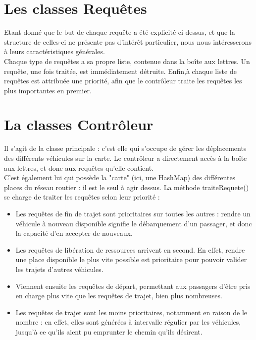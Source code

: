 \documentclass[a4paper, titlepage]{report}
\begin{document}
\section{Les classes Requêtes}

Etant donné que le but de chaque requête a été explicité ci-dessus, et que la structure de celles-ci ne présente pas d'intérêt particulier, nous nous intéresserons à leurs caractéristiques générales. \\
Chaque type de requêtes a sa propre liste, contenue dans la boîte aux lettres. Un requête, une fois traitée, est immédiatement détruite. Enfin,à chaque liste de requêtes est attribuée une priorité, afin que le contrôleur traite les requêtes les plus importantes en premier.
\section{La classes Contrôleur}

Il s'agit de la classe principale : c'est elle qui s'occupe de gérer les déplacements des différents véhicules sur la carte. Le contrôleur a directement accès à la boîte aux lettres, et donc aux requêtes qu'elle contient.\\
C'est également lui qui possède la "carte" (ici, une HashMap) des différentes places du réseau routier : il est le seul à agir dessus.
La méthode traiteRequete() se charge de traiter les requêtes selon leur priorité :\\
 \begin{itemize}
      \item Les requêtes de fin de trajet sont prioritaires sur toutes les autres : rendre un véhicule à nouveau disponible signifie le débarquement d'un passager, et donc la capacité d'en accepter de nouveaux.
      \item Les requêtes de libération de ressources arrivent en second. En effet, rendre une place disponible le plus vite possible est prioritaire pour pouvoir valider les trajets d'autres véhicules.
      \item Viennent ensuite les requêtes de départ, permettant aux passagers d'être pris en charge plus vite que les requêtes de trajet, bien plus nombreuses.
      \item Les requêtes de trajet sont les moins prioritaires, notamment en raison de le nombre : en effet, elles sont générées à intervalle régulier par les véhicules, jusqu'à ce qu'ils aient pu emprunter le chemin qu'ils désirent.
      \end{itemize}
\end{document}
